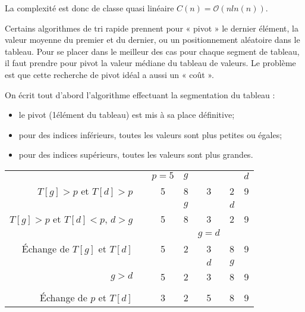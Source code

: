 \documentclass[10pt,fleqn]{article} %
\begin{document}
La complexité est donc de classe quasi linéaire $C(n)=\mathcal{O}\left(n ln(n)\right)$.

\begin{rem}
Certains algorithmes de tri rapide prennent pour « pivot » le dernier élément, la valeur moyenne du premier et du dernier, ou un positionnement aléatoire dans le tableau. Pour se placer dans le meilleur des cas pour chaque segment de tableau, il faut prendre pour pivot la valeur médiane du tableau de valeurs. Le problème est que cette recherche de pivot idéal a aussi un « coût ».
\end{rem}

On écrit tout d'abord l'algorithme effectuant la segmentation du tableau :
\begin{itemize}
\item le pivot (1\ier élément du tableau) est mis à sa place définitive;
\item pour des indices inférieurs, toutes les valeurs sont plus petites ou égales;
\item pour des indices supérieurs, toutes les valeurs sont plus grandes.
\end{itemize}

\begin{center}
\begin{tabular}{rc|c|c|c|c|c|}
&& $p=5$ & $g$ & & & $d$ \\
\cline{3-7}
$T[g]>p$ et $T[d]>p$&&\cellcolor{black!30}5 & \cellcolor{black!10}8 & 3 & 2 & \cellcolor{black!10}9 \\
\cline{3-7}
&& & $g$ &  & $d$ &  \\
\cline{3-7}
$T[g]>p$ et $T[d]<p$, $d>g$ &&\cellcolor{black!30}5 & \cellcolor{black!10}8 & 3 & \cellcolor{black!10}2 & \cellcolor{black!10}9 \\
\cline{3-7}
&& &  & $g=d$ & &  \\
\cline{3-7}
Échange de $T[g]$ et $T[d]$ &&\cellcolor{black!30}5 & \cellcolor{black!10}2 & 
\cellcolor{black!10}3 & \cellcolor{black!10}8 & \cellcolor{black!10}9 \\
\cline{3-7}
&& &  & $d$ & $g$ &  \\
\cline{3-7}
$g>d$ &&\cellcolor{black!30}5 & \cellcolor{black!10}2 & 
\cellcolor{black!10}3 & \cellcolor{black!10}8 & \cellcolor{black!10}9 \\
\cline{3-7}
&& &  & & &  \\
\cline{3-7}
Échange de $p$ et $T[d]$ &&\cellcolor{black!10}3 & \cellcolor{black!10}2 & 
\cellcolor{black!30}5 & \cellcolor{black!10}8 & \cellcolor{black!10}9 \\
\cline{3-7}
\end{tabular}
\end{center}
\end{document}
